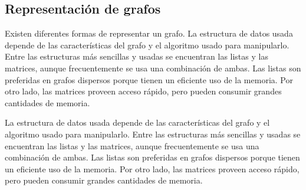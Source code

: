 \subsection{Representación de grafos}
Existen diferentes formas de representar un grafo. La estructura de datos usada depende de las características del grafo y el algoritmo usado para manipularlo. Entre las estructuras más sencillas y usadas se encuentran las listas y las matrices, aunque frecuentemente se usa una combinación de ambas. Las listas son preferidas en grafos dispersos porque tienen un eficiente uso de la memoria. Por otro lado, las matrices proveen acceso rápido, pero pueden consumir grandes cantidades de memoria.

La estructura de datos usada depende de las características del grafo y el algoritmo usado para manipularlo. Entre las estructuras más sencillas y usadas se encuentran las listas y las matrices, aunque frecuentemente se usa una combinación de ambas. Las listas son preferidas en grafos dispersos porque tienen un eficiente uso de la memoria. Por otro lado, las matrices proveen acceso rápido, pero pueden consumir grandes cantidades de memoria.